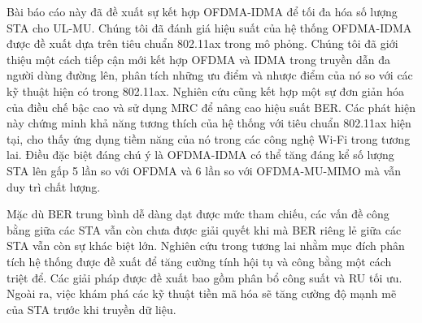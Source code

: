 Bài báo cáo này đã đề xuất sự kết hợp OFDMA-IDMA để tối đa hóa số lượng STA cho UL-MU.
Chúng tôi đã đánh giá hiệu suất của hệ thống OFDMA-IDMA được đề xuất dựa trên tiêu chuẩn 802.11ax trong mô phỏng. Chúng tôi đã giới thiệu một cách tiếp cận mới kết hợp OFDMA và IDMA trong truyền dẫn đa người dùng đường lên, phân tích những ưu điểm và nhược điểm của nó so với các kỹ thuật hiện có trong 802.11ax. Nghiên cứu cũng kết hợp một sự đơn giản hóa của điều chế bậc cao và sử dụng MRC để nâng cao hiệu suất BER.
Các phát hiện này chứng minh khả năng tương thích của hệ thống với tiêu chuẩn 802.11ax hiện tại, cho thấy ứng dụng tiềm năng của nó trong các công nghệ Wi-Fi trong tương lai. Điều đặc biệt đáng chú ý là OFDMA-IDMA có thể tăng đáng kể số lượng STA lên gấp 5 lần so với OFDMA và 6 lần so với OFDMA-MU-MIMO mà vẫn duy trì chất lượng.

Mặc dù BER trung bình dễ dàng dạt được mức tham chiếu, các vấn đề công bằng giữa các STA vẫn còn chưa được giải quyết khi mà BER riêng lẻ giữa các STA vẫn còn sự khác biệt lớn. Nghiên cứu trong tương lai nhằm mục đích phân tích hệ thống được đề xuất để tăng cường tính hội tụ và công bằng một cách triệt để. Các giải pháp được đề xuất bao gồm phân bổ công suất và RU tối ưu. Ngoài ra, việc khám phá các kỹ thuật tiền mã hóa sẽ tăng cường độ mạnh mẽ của STA trước khi truyền dữ liệu.